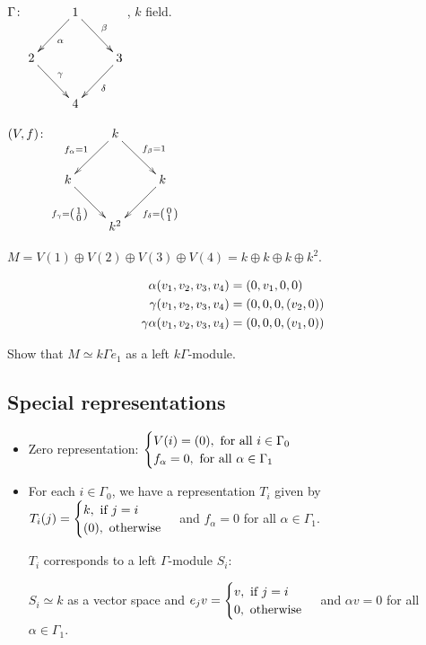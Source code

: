 \begin{exam}
$\Gamma\colon \xymatrix{ & 1\ar[dl]^\alpha\ar[dr]^\beta & \\
2\ar[dr]^\gamma & & 3\ar[dl]^\delta\\
& 4 & }$, $k$ field.

$(V,f)\colon \xymatrix{ & k\ar[dl]_{f_\alpha = 1}\ar[dr]^{f_\beta=1} & \\
k\ar[dr]_{f_\gamma=\left(\begin{smallmatrix} 1\\ 0\end{smallmatrix}\right)} & & k\ar[dl]^{f_\delta=\left(\begin{smallmatrix} 0\\ 1\end{smallmatrix}\right)}\\
& k^2 & }$

$M = V(1) \oplus V(2) \oplus V(3) \oplus V(4) = k\oplus k\oplus
k\oplus k^2$.

\begin{align}
\alpha (v_1,v_2,v_3,v_4)  & = (0, v_1, 0, 0 )\notag\\
\gamma (v_1,v_2,v_3,v_4)  & = (0, 0, 0, (v_2, 0) )\notag\\
\gamma\alpha (v_1,v_2,v_3,v_4)  & = (0, 0, 0, (v_1, 0) )\notag
\end{align}
\end{exam}

\begin{exer} Show that $M\simeq k\Gamma e_1$ as a left
  $k\Gamma$-module.
\end{exer}

\subsection{Special representations}
\begin{itemize}
\item Zero representation:  
$\begin{cases} 
V(i) = (0), \text{\ for all $i\in\Gamma_0$}\notag\\
f_\alpha = 0, \text{\ for all $\alpha\in \Gamma_1$}\notag
\end{cases}$
\item For each $i\in\Gamma_0$, we have a representation $T_i$ given by
$T_i(j) = \begin{cases} k, \text{\ if $j = i$}\notag\\
(0), \text{\ otherwise}\notag
\end{cases}$
and $f_\alpha = 0$ for all $\alpha\in \Gamma_1$. 

$T_i$ corresponds to a left $\Gamma$-module $S_i$:

$S_i\simeq k$ as a vector space and $e_j v = \begin{cases} v, \text{\
    if $j = i$}\notag\\ 0, \text{\ otherwise}\notag\end{cases}$ and
$\alpha v = 0$ for all $\alpha\in \Gamma_1$. 
\end{itemize}

